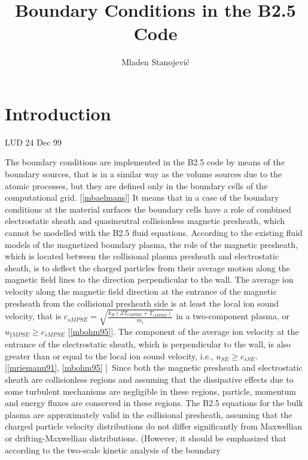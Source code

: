 \documentclass[11pt]{article}
\begin{document}
\title{Boundary Conditions in the B2.5 Code}
\author{Mladen Stanojevi\'{c}}
\maketitle
\tableofcontents

\section{Introduction}

LUD 24 Dec 99\bigskip

The boundary conditions are implemented in the B2.5 code by means of the
boundary sources, that is in a similar way as the volume sources due to the
atomic processes, but they are defined only in the boundary cells of the
computational grid. [\ref{mbaelmans}] It means that in a case of the
boundary conditions at the material surfaces the boundary cells have a role
of combined electrostatic sheath and quasineutral collisionless magnetic
presheath, which cannot be modelled with the B2.5 fluid equations. According
to the existing fluid models of the magnetized boundary plasma, the role of
the magnetic presheath, which is located between the collisional plasma
presheath and electrostatic sheath, is to deflect the charged particles from
their average motion along the magnetic field lines to the direction
perpendicular to the wall. The average ion velocity along the magnetic field
direction at the entrance of the magnetic presheath from the collisional
presheath side is at least the local ion sound velocity, that is $c_{sMPSE}=%
\sqrt{\frac {k_{B}(ZT_{eMPSE}+T_{iMPSE})}{m_{i}}}$ in a two-component
plasma, or $u_{\Vert MPSE}\geq c_{sMPSE}$ [\ref{mbohm95}]. The component of
the average ion velocity at the entrance of the electrostatic sheath, which
is perpendicular to the wall, is also greater than or equal to the local ion
sound velocity, i.e., $u_{SE}\geq c_{sSE}$. [\ref{mriemann91}, \ref{mbohm95}%
]\ Since both the magnetic presheath and electrostatic sheath are
collisionless regions and assuming that the dissipative effects due to some
turbulent mechanisms are negligible in these regions, particle, momentum and
energy fluxes are conserved in these regions. The B2.5 equations for the
bulk plasma are approximately valid in the collisional presheath, assuming
that the charged particle velocity distributions do not differ significantly
from Maxwellian or drifting-Maxwellian distributions. (However, it should be
emphasized that according to the two-scale kinetic analysis of the boundary
\end{document}
